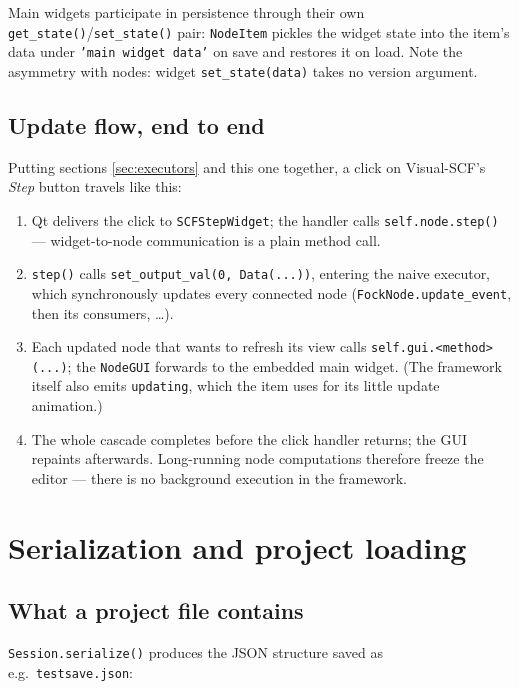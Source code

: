 \documentclass[10pt,a4paper]{article}
\newcommand{\code}[1]{\texttt{\small #1}}
\begin{document}
Main widgets participate in persistence through their own
\code{get\_state()}/\code{set\_state()} pair: \code{NodeItem} pickles the widget state
into the item's data under \code{'main widget data'} on save and restores it on load.
Note the asymmetry with nodes: widget \code{set\_state(data)} takes no version argument.

\subsection{Update flow, end to end}

Putting sections \ref{sec:executors} and this one together, a click on Visual-SCF's
\emph{Step} button travels like this:

\begin{enumerate}[itemsep=1pt]
\item Qt delivers the click to \code{SCFStepWidget}; the handler calls
      \code{self.node.step()} --- widget-to-node communication is a plain method call.
\item \code{step()} calls \code{set\_output\_val(0, Data(...))}, entering the naive
      executor, which synchronously updates every connected node
      (\code{FockNode.update\_event}, then its consumers, \ldots).
\item Each updated node that wants to refresh its view calls
      \code{self.gui.<method>(...)}; the \code{NodeGUI} forwards to the embedded main
      widget. (The framework itself also emits \code{updating}, which the item uses
      for its little update animation.)
\item The whole cascade completes before the click handler returns; the GUI repaints
      afterwards. Long-running node computations therefore freeze the editor --- there
      is no background execution in the framework.
\end{enumerate}

\section{Serialization and project loading}
\label{sec:serialization}

\subsection{What a project file contains}

\code{Session.serialize()} produces the JSON structure saved as e.g.\
\code{testsave.json}:
\end{document}
